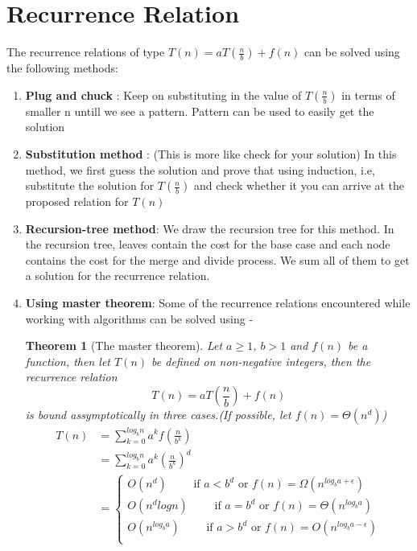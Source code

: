 \documentclass{article}
\newtheorem*{theorem}{Theorem}
\begin{document}
\section{Recurrence Relation}
	The recurrence relations of type $T(n) = aT(\frac{n}{b}) + f(n)$ can be solved using the following methods:\\
	\begin{enumerate}
		\item \textbf{Plug and chuck} : Keep on substituting in the value of $T(\frac{n}{b})$ in terms of smaller n untill we see a pattern. Pattern can be used to easily get the solution
		\item \textbf{Substitution method} : (This is more like check for your solution) In this method, we first guess the solution and prove that using induction, i.e, substitute the solution for $T(\frac{n}{b})$ and check whether it you can arrive at the proposed relation for $T(n)$
		\item \textbf{Recursion-tree method}: We draw the recursion tree for this method. In the recursion tree, leaves contain the cost for the base case and each node contains the cost for the merge and divide process. We sum all of them to get a solution for the recurrence relation. 
		\item \textbf{Using master theorem}: Some of the recurrence relations encountered while working with algorithms can be solved using -
		\begin{theorem}[The master theorem]
		Let $a\geq 1$, $b>1$ and $f(n)$ be a function, then let $T(n)$ be defined on non-negative integers, then the recurrence relation
		\[T(n) = aT(\frac{n}{b}) + f(n) \] is bound assymptotically in three cases.(If possible, let $f(n)= \Theta(n^d)$)
		\begin{align*}
			T(n) &= \sum_{k=0}^{log_bn} a^k f(\frac{n}{b^k})\\
				&= \sum_{k=0}^{log_bn} a^k (\frac{n}{b^k})^d\\ 
				&= 
			\begin{cases}
			O(n^d) \qquad\text{ if } a<b^d\text{ or }f(n)= \Omega(n^{log_ba+\epsilon})\\
			O(n^d logn) \qquad \text{ if } a=b^d\text{ or }f(n)= \Theta(n^{log_ba})\\
			O(n^{log_ba}) \qquad \text{ if } a>b^d\text{ or }f(n)= O(n^{log_ba-\epsilon})\\
			\end{cases}	
		\end{align*}
		\end{theorem}


\end{enumerate}
\end{document}
